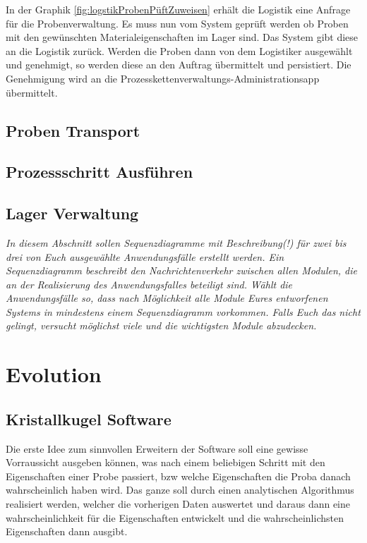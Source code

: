 \documentclass[enabledeprecatedfontcommands,fontsize=12pt,paper=a4,twoside]{scrartcl}
\begin{document}
In der Graphik \ref{fig:logstikProbenPüftZuweisen} erhält die Logistik eine Anfrage für die Probenverwaltung. Es muss nun vom System geprüft werden ob Proben mit den gewünschten Materialeigenschaften im Lager sind. Das System gibt diese an die Logistik zurück. Werden die Proben dann von dem Logistiker ausgewählt und genehmigt, so werden diese an den Auftrag übermittelt und persistiert. Die Genehmigung wird an die Prozesskettenverwaltungs-Administrationsapp übermittelt.

\subsection{Proben Transport}
\subsection{Prozessschritt Ausführen}
\subsection{Lager Verwaltung}



{\it In diesem Abschnitt sollen Sequenzdiagramme mit Beschreibung(!)
  für zwei bis drei von Euch ausgewählte
    Anwendungsfälle
  erstellt werden. Ein Sequenzdiagramm beschreibt den
  Nachrichtenverkehr zwischen allen Modulen, die an der Realisierung
  des Anwendungsfalles beteiligt sind.  Wählt die
    Anwendungsfälle so, dass nach Möglichkeit alle Module Eures
    entworfenen Systems in mindestens einem Sequenzdiagramm
    vorkommen. Falls Euch das nicht gelingt, versucht möglichst viele
    und die wichtigsten Module abzudecken. }

\section{Evolution}

\label{sec:evolution}

\subsection{Kristallkugel Software}
{
Die erste Idee zum sinnvollen Erweitern der Software soll eine gewisse Vorraussicht ausgeben können, was nach einem beliebigen Schritt mit den Eigenschaften einer Probe passiert, bzw welche Eigenschaften die Proba danach wahrscheinlich haben wird. Das ganze soll durch einen analytischen Algorithmus realisiert werden, welcher die vorherigen Daten auswertet und daraus dann eine wahrscheinlichkeit für die Eigenschaften entwickelt und die wahrscheinlichsten Eigenschaften dann ausgibt. 
}
\end{document}
